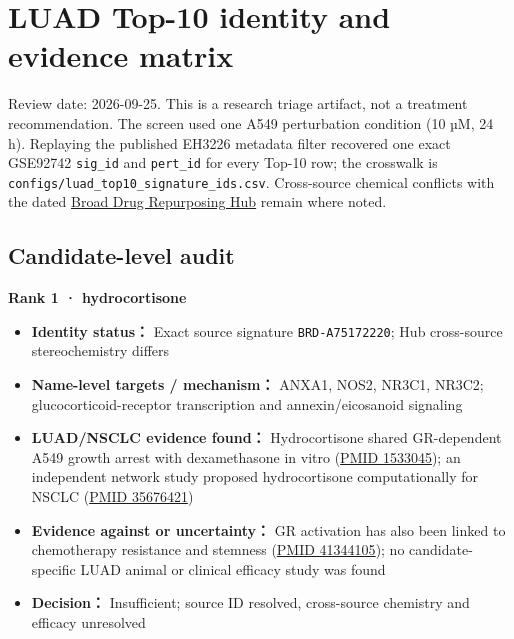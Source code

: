 \documentclass[
  10pt,
]{ctexart}
\author{}
\date{}
\providecommand{\tightlist}{%
  \setlength{\itemsep}{0pt}\setlength{\parskip}{0pt}}
\begin{document}
\section{LUAD Top-10 identity and evidence
matrix}\label{luad-top-10-identity-and-evidence-matrix}

Review date: 2026-09-25. This is a research triage artifact, not a
treatment recommendation. The screen used one A549 perturbation
condition (10 µM, 24 h). Replaying the published EH3226 metadata filter
recovered one exact GSE92742 \texttt{sig\_\allowbreak{}id} and \texttt{pert\_\allowbreak{}id} for
every Top-10 row; the crosswalk is
\texttt{configs/\allowbreak{}luad\_\allowbreak{}top10\_\allowbreak{}signature\_\allowbreak{}ids.\allowbreak{}csv}. Cross-source chemical
conflicts with the dated
\href{https://repo-hub.broadinstitute.org/repurposing}{Broad Drug
Repurposing Hub} remain where noted.

\subsection{Candidate-level audit}\label{candidate-level-audit}

\textbf{Rank 1 · hydrocortisone}

\begin{itemize}
\tightlist
\item
  \textbf{Identity status：} Exact source signature
  \texttt{BRD-A75172220}; Hub cross-source stereochemistry differs
\item
  \textbf{Name-level targets / mechanism：} ANXA1, NOS2, NR3C1, NR3C2;
  glucocorticoid-receptor transcription and annexin/eicosanoid signaling
\item
  \textbf{LUAD/NSCLC evidence found：} Hydrocortisone shared
  GR-dependent A549 growth arrest with dexamethasone in vitro
  (\href{https://pubmed.ncbi.nlm.nih.gov/1533045/}{PMID 1533045}); an
  independent network study proposed hydrocortisone computationally for
  NSCLC (\href{https://pubmed.ncbi.nlm.nih.gov/35676421/}{PMID
  35676421})
\item
  \textbf{Evidence against or uncertainty：} GR activation has also been
  linked to chemotherapy resistance and stemness
  (\href{https://pubmed.ncbi.nlm.nih.gov/41344105/}{PMID 41344105}); no
  candidate-specific LUAD animal or clinical efficacy study was found
\item
  \textbf{Decision：} Insufficient; source ID resolved, cross-source
  chemistry and efficacy unresolved
\end{itemize}
\end{document}
